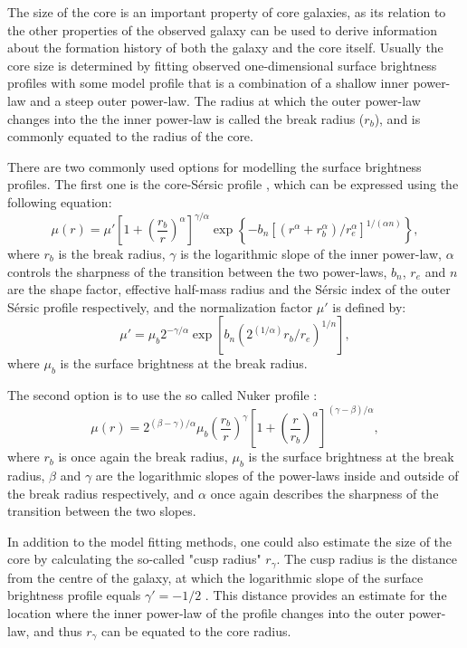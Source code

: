 \documentclass[english, oneside]{HYgradu}
\begin{document}
The size of the core is an important property of core galaxies, as its relation to the other properties of the observed galaxy can be used to derive information about the formation history of both the galaxy and the core itself. Usually the core size is determined by fitting observed one-dimensional surface brightness profiles with some model profile that is a combination of a shallow inner power-law and a steep outer power-law. The radius at which the outer power-law changes into the the inner power-law is called the break radius ($r_b$), and is commonly equated to the radius of the core.

There are two commonly used options for modelling the surface brightness profiles. The first one is the core-Sérsic profile \citep{Graham2003}, which can be expressed using the following equation:
\begin{equation}
\mu(r) = \mu' \left[ 1 + \left( \frac{r_b}{r} \right)^\alpha \right]^{\gamma / \alpha} \exp \left\lbrace -b_n \left[ \left( r^\alpha + r_b^\alpha \right) / r_e^\alpha \right]^{1/(\alpha n)} \right\rbrace, \label{eq:core-sersic}
\end{equation}
where $r_b$ is the break radius, $\gamma$ is the logarithmic slope of the inner power-law, $\alpha$ controls the sharpness of the transition between the two power-laws, $b_n$, $r_e$ and $n$ are the shape factor, effective half-mass radius and the Sérsic index of the outer Sérsic profile respectively, and the normalization factor $\mu'$ is defined by:
\begin{equation}
\mu' = \mu_b 2^{-\gamma/\alpha} \exp \left[ b_n \left( 2^{(1/\alpha)} r_b/r_e \right)^{1/n} \right], 
\label{eq:mu_dot}
\end{equation}
where $\mu_b$ is the surface brightness at the break radius. 

The second option is to use the so called Nuker profile \citep{Lauer1995}:
\begin{equation}
\mu(r) = 2^{(\beta - \gamma) / \alpha} \mu_b \left( \frac{r_b}{r} \right)^\gamma \left[ 1 + \left( \frac{r}{r_b} \right)^\alpha \right]^{(\gamma - \beta)/\alpha},
\label{eq:nuker}
\end{equation}
where $r_b$ is once again the break radius, $\mu_b$ is the surface brightness at the break radius, $\beta$ and $\gamma$ are the logarithmic slopes of the power-laws inside and outside of the break radius respectively, and $\alpha$ once again describes the sharpness of the transition between the two slopes.

In addition to the model fitting methods, one could also estimate the size of the core by calculating the so-called "cusp radius" $r_\gamma$. The cusp radius is the distance from the centre of the galaxy, at which the logarithmic slope of the surface brightness profile equals $\gamma' = -1/2$ \citep{Carollo1997, Lauer2007Cusp}. This distance provides an estimate for the location where the inner power-law of the profile changes into the outer power-law, and thus $r_\gamma$ can be equated to the core radius. 
\end{document}
